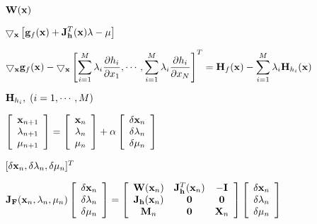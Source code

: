 \documentclass{article}
\def\lthtmlcheckvsize{\ifdim\ht\sizebox<\vsize 
  \ifdim\wd\sizebox<\hsize\expandafter\hfill\fi \expandafter\vfill
  \else\expandafter\vss\fi}%
\begin{document}
{\newpage\clearpage
{}%
$\displaystyle {\bf W}({\bf x})$%
\lthtmlindisplaymathZ
\lthtmlcheckvsize\clearpage}

{\newpage\clearpage
{}%
$\displaystyle \bigtriangledown_{\bf x}
\left[{\bf g}_f({\bf x})+{\bf J}_{\bf h}^T({\bf x}){\bf\lambda}
-{\bf\mu}\right]$%
\lthtmlindisplaymathZ
\lthtmlcheckvsize\clearpage}

{\newpage\clearpage
{}%
$\displaystyle \bigtriangledown_{\bf x} {\bf g}_f({\bf x})
-\bigtriangledown_{\bf x} \left[\sum_{i=1}^M\lambda_i\frac{\partial h_i}{\partial x_1},
\cdots,\sum_{i=1}^M\lambda_i\frac{\partial h_i}{\partial x_N}\right]^T
={\bf H}_f({\bf x})-\sum_{i=1}^M\lambda_i{\bf H}_{h_i}({\bf x})$%
\lthtmlindisplaymathZ
\lthtmlcheckvsize\clearpage}

{\newpage\clearpage
{}%
$ {\bf H}_{h_i},\;
(i=1,\cdots,M)$%
\lthtmlindisplaymathZ
\lthtmlcheckvsize\clearpage}

{\newpage\clearpage
{}%
$\displaystyle \left[\begin{array}{c}{\bf x}_{n+1}\\{\bf\lambda}_{n+1}\\
{\bf\mu}_{n+1}\end{array}\right]
=\left[\begin{array}{c}{\bf x}_n\\{\bf\lambda}_n\\
{\bf\mu}_n\end{array}\right]
+\alpha\left[\begin{array}{c}\delta{\bf x}_n\\\delta{\bf\lambda}_n\\
\delta{\bf\mu}_n\end{array}\right]$%
\lthtmlindisplaymathZ
\lthtmlcheckvsize\clearpage}

{\newpage\clearpage
{}%
$ [\delta{\bf x}_n,\delta{\bf\lambda}_n,\delta{\bf\mu}_n]^T$%
\lthtmlindisplaymathZ
\lthtmlcheckvsize\clearpage}

{\newpage\clearpage
{}%
$\displaystyle {\bf J}_{\bf F}({\bf x}_n,{\bf\lambda}_n,{\bf\mu}_n)
\left[\begin{array}{c}
\delta{\bf x}_n\\\delta{\bf\lambda}_n\\\delta{\bf\mu}_n
\end{array}\right]
=\left[\begin{array}{ccc}
{\bf W}({\bf x}_n) & {\bf J}^T_{\bf h}({\bf x}_n) & -{\bf I}\\
{\bf J}_{\bf h}({\bf x}_n) & {\bf0} & {\bf0} \\
{\bf M}_n & {\bf0} & {\bf X}_n\end{array}\right]
\left[\begin{array}{c}
\delta{\bf x}_n\\\delta{\bf\lambda}_n\\\delta{\bf\mu}_n
\end{array}\right]$%
\lthtmlindisplaymathZ
\lthtmlcheckvsize\clearpage}
\end{document}
